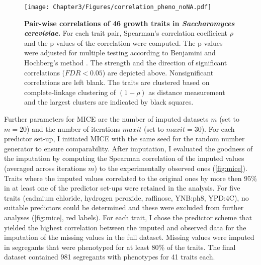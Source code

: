 \begin{figure}[hbtp]
	\centering
	\texttt{[image: Chapter3/Figures/correlation\_pheno\_noNA.pdf]}
	\caption[\textbf{Pairwise correlations of \num{46} growth traits in \emph{Saccharomyces cerevisiae}.} Generated via R function \textit{corrplot::corrplot}]{\textbf{Pair-wise correlations of \num{46} growth traits in \emph{Saccharomyces cerevisiae}.} For each trait pair, Spearman's correlation coefficient \(\rho\) and the p-values of the correlation were computed. The p-values were adjusted for multiple testing according to Benjamini and Hochberg's method \citep{Benjamini1995}. The strength and the direction of significant correlations (\(FDR < 0.05\)) are depicted above. Nonsignificant correlations are left blank. The traits are clustered based on complete-linkage clustering of \((1-\rho)\) as distance measurement and the largest clusters are indicated by black squares.}
 	\label{fig:traitcorrelations}
\end{figure}


Further parameters for MICE are the number of imputed datasets \(m\) (set to \(m=20\)) and the number of iterations \(maxit\) (set to \(maxit=30\)). For each predictor set-up, I initiated MICE with the same seed for the random number generator to ensure comparability. After imputation, I evaluated the goodness of the imputation  by computing the Spearman correlation of the imputed values (averaged across iterations \(m\)) to the experimentally observed ones (\cref{fig:mice}). Traits where the imputed values correlated to the original ones by more then \num{95}\% in at least one of the predictor set-ups were retained in the analysis. For five traits (cadmium chloride, hydrogen peroxide, raffinose, YNB:ph8, YPD:4C), no suitable predictors could be determined and these were excluded from further analyses (\cref{fig:mice}, red labels). For each trait, I chose the predictor scheme that yielded the highest correlation between the imputed and observed data for the imputation of the missing values in the full dataset. Missing values were imputed in segregants that were phenotyped for at least \num{80}\% of the traits. The final dataset contained \num{981} segregants with phenotypes for \num{41} traits each. 
 	
